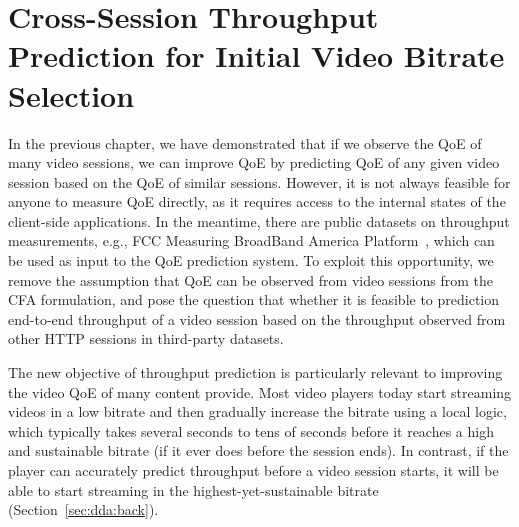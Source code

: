 \chapter{Cross-Session Throughput Prediction for Initial Video Bitrate Selection}
\label{ch:dda}

\providecommand{\name}{{DDA}\xspace}

\providecommand{\session}{\ensuremath{\mathit{s}}}
\providecommand{\SimilarSessions}[1]{\ensuremath{\mathit{SimilarSessions(#1)}}}
\providecommand{\timestamp}[1]{\ensuremath{\mathit{t_{#1}}}}
\providecommand{\AllFeatures}{\ensuremath{\mathcal{F}}}
\providecommand{\Features}{\ensuremath{\mathit{F}}}
\providecommand{\FeatureValues}[2]{\ensuremath{\mathit{FV(#1,#2)}}}
\providecommand{\TimeWindow}[2]{\ensuremath{\mathit{TimeWindow(#1,#2)}}}
\providecommand{\TimeDim}[2]{\ensuremath{\mathit{T_{#1,#2}}}}
\providecommand{\TimeRange}{\ensuremath{\mathit{T}}}
\providecommand{\Aggregation}[3]{\ensuremath{\mathit{Agg(#1,#2,#3)}}}
\providecommand{\QualitySummary}{\ensuremath{\mathit{Median}}}
\providecommand{\Error}[2]{\ensuremath{\mathit{Err(#1,#2)}}}
\providecommand{\Pred}[1]{\ensuremath{\mathit{Pred(#1)}}}
\providecommand{\Throughput}[1]{\ensuremath{\mathit{#1_{w}}}}
\providecommand{\Pair}[2]{\ensuremath{\mathit{\langle#1,#2\rangle}}}
\providecommand{\optimal}{\ensuremath{\mathit{*}}}
\providecommand{\Est}{\ensuremath{\mathit{Est}}}
\providecommand{\Estimation}[1]{\ensuremath{\mathit{\Est(#1)}}}
\providecommand{\Model}{\ensuremath{\mathit{M}}}
\providecommand{\Agg}[2]{\ensuremath{\mathit{Agg(#1,#2)}}}

In the previous chapter, we have demonstrated that if we observe the QoE of many 
video sessions, we can improve QoE by predicting QoE of any given
video session based on the QoE of similar sessions. 
However, it is not always feasible for anyone to measure QoE directly, 
as it requires access to the internal states of the client-side applications.
In the meantime, there are public datasets on 
throughput measurements, e.g., FCC Measuring 
BroadBand America Platform~\cite{fcc-2014}, which can be used as input to the QoE
prediction system.
To exploit this opportunity, we remove the assumption that QoE 
can be observed from video sessions from the CFA formulation, and 
pose the question that whether it is feasible to prediction end-to-end 
throughput of a video session based on the throughput 
observed from other HTTP sessions in third-party datasets.

The new objective of throughput prediction is particularly relevant to improving the
video QoE of many content provide.  Most video players today start streaming videos 
in a low bitrate and then gradually increase the bitrate using a local logic, which
typically takes several seconds to tens of seconds before it reaches a high and 
sustainable bitrate (if it ever does before the session ends).
In contrast, if the player can accurately predict throughput before 
a video session starts, it will be able to start streaming in the highest-yet-sustainable 
bitrate (Section~\ref{sec:dda:back}).

